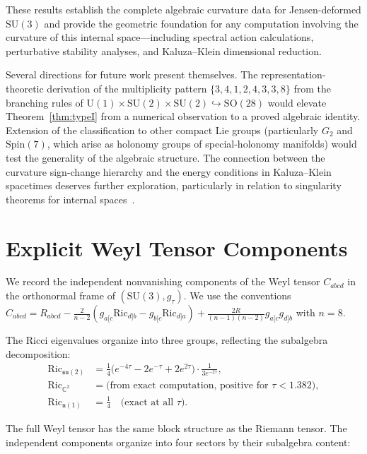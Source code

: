 \documentclass[12pt]{article}
\theoremstyle{definition}
\theoremstyle{remark}
\begin{document}
These results establish the complete algebraic curvature data for Jensen-deformed $\mathrm{SU}(3)$ and provide the geometric foundation for any computation involving the curvature of this internal space---including spectral action calculations, perturbative stability analyses, and Kaluza--Klein dimensional reduction.

Several directions for future work present themselves.  The representation-theoretic derivation of the multiplicity pattern $\{3,4,1,2,4,3,3,8\}$ from the branching rules of $\mathrm{U}(1)\times\mathrm{SU}(2)\times\mathrm{SU}(2)\hookrightarrow\mathrm{SO}(28)$ would elevate Theorem~\ref{thm:typeI} from a numerical observation to a proved algebraic identity.  Extension of the classification to other compact Lie groups (particularly $G_2$ and $\mathrm{Spin}(7)$, which arise as holonomy groups of special-holonomy manifolds) would test the generality of the algebraic structure.  The connection between the curvature sign-change hierarchy and the energy conditions in Kaluza--Klein spacetimes deserves further exploration, particularly in relation to singularity theorems for internal spaces~\cite{Penrose1965,HawkingPenrose1970}.

\appendix
\section{Explicit Weyl Tensor Components}
\label{app:weyl}

We record the independent nonvanishing components of the Weyl tensor $C_{abcd}$ in the orthonormal frame of $(\mathrm{SU}(3),g_\tau)$.  We use the conventions $C_{abcd}=R_{abcd}-\frac{2}{n-2}(g_{a[c}\mathrm{Ric}_{d]b}-g_{b[c}\mathrm{Ric}_{d]a})+\frac{2R}{(n-1)(n-2)}g_{a[c}g_{d]b}$ with $n=8$.

The Ricci eigenvalues organize into three groups, reflecting the subalgebra decomposition:
\begin{align}
\mathrm{Ric}_{\mathfrak{su}(2)} &= \tfrac{1}{4}\bigl(e^{-4\tau}-2e^{-\tau}+2e^{2\tau}\bigr) \cdot \frac{1}{3e^{-2\tau}}, \label{eq:ric_su2}\\
\mathrm{Ric}_{\mathbb{C}^2} &= \text{(from exact computation, positive for $\tau<1.382$)}, \label{eq:ric_c2}\\
\mathrm{Ric}_{\mathfrak{u}(1)} &= \tfrac{1}{4} \quad \text{(exact at all $\tau$)}. \label{eq:ric_u1}
\end{align}

The full Weyl tensor has the same block structure as the Riemann tensor.  The independent components organize into four sectors by their subalgebra content:
\end{document}

